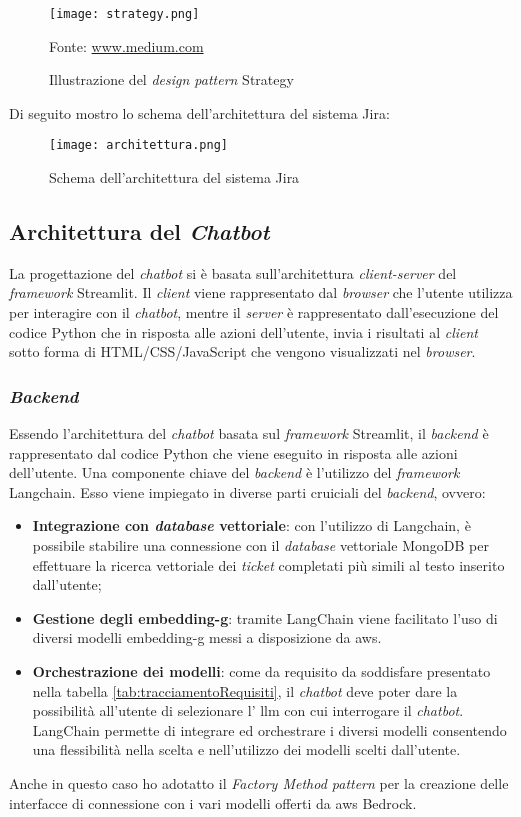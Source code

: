 \begin{figure}[H]
    \centering
    \texttt{[image: strategy.png]}
    \caption{Illustrazione del \textit{design pattern} Strategy}
    \small Fonte: \href{https://medium.com/litslink/design-patterns-strategy-in-examples-eae7bf10a817} {www.medium.com}
    \label{fig:strategy}
\end{figure}

\noindent
Di seguito mostro lo schema dell'architettura del sistema Jira:
\begin{figure}[H]
    \centering
    \texttt{[image: architettura.png]}
    \caption{Schema dell'architettura del sistema Jira}
    \label{fig:architetturaJira}
\end{figure}

\subsection{Architettura del \textit{Chatbot}}
La progettazione del \textit{chatbot} si è basata sull'architettura \textit{client-server} del \textit{framework} Streamlit. Il \textit{client} viene rappresentato dal \textit{browser} che l'utente utilizza per interagire con il \textit{chatbot}, mentre il \textit{server} è rappresentato dall'esecuzione del codice Python che in risposta alle azioni dell'utente, invia i risultati al \textit{client} sotto forma di HTML/CSS/JavaScript che vengono visualizzati nel \textit{browser}.
\subsubsection{\textit{Backend}}
Essendo l'architettura del \textit{chatbot} basata sul \textit{framework} Streamlit, il \textit{backend} è rappresentato dal codice Python che viene eseguito in risposta alle azioni dell'utente.
Una componente chiave del \textit{backend} è l'utilizzo del \textit{framework} Langchain. Esso viene impiegato in diverse parti cruiciali del \textit{backend}, ovvero:
\begin{itemize}
    \item \textbf{Integrazione con \textit{database} vettoriale}: con l'utilizzo di Langchain, è possibile stabilire una connessione con il \textit{database} vettoriale MongoDB per effettuare la ricerca vettoriale dei \textit{ticket} completati più simili al testo inserito dall'utente;
    \item \textbf{Gestione degli \gls{embedding-g}}: tramite LangChain viene facilitato l'uso di diversi modelli \gls{embedding-g} messi a disposizione da \gls{aws}. 
    \item \textbf{Orchestrazione dei modelli}: come da requisito da soddisfare presentato nella tabella \ref{tab:tracciamentoRequisiti}, il \textit{chatbot} deve poter dare la possibilità all'utente di selezionare l' \gls{llm} con cui interrogare il \textit{chatbot}. LangChain permette di integrare ed orchestrare i diversi modelli consentendo una flessibilità nella scelta e nell'utilizzo dei modelli scelti dall'utente.
\end{itemize} 
\noindent
Anche in questo caso ho adotatto il \textit{Factory Method pattern} per la creazione delle interfacce di connessione con i vari modelli offerti da \gls{aws} Bedrock. 
